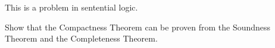 \begin{problem}
  This is a problem in sentential logic.

  \step
  Show that the Compactness Theorem can be proven from 
  the Soundness Theorem and the Completeness Theorem.
\end{problem}
